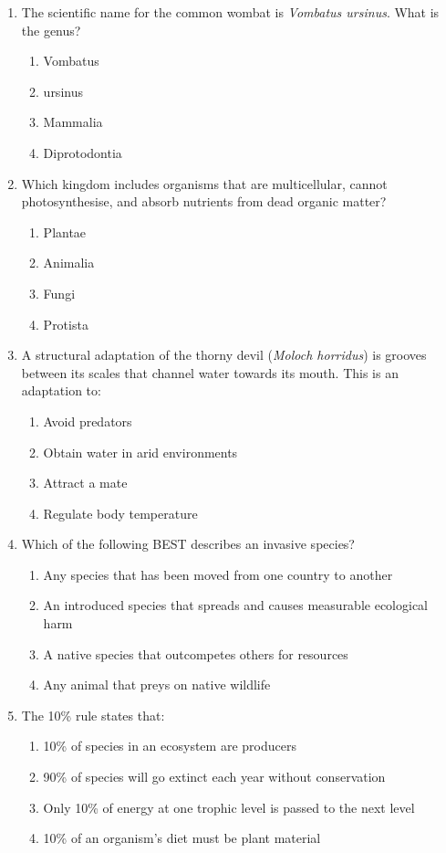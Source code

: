 \documentclass[11pt,a4paper]{article}
\begin{document}
\begin{enumerate}[label=\textbf{\arabic*.}, itemsep=10pt]
\item The scientific name for the common wombat is \textit{Vombatus ursinus}. What is the genus?
\begin{enumerate}[label=\Alph*., itemsep=2pt]
  \item Vombatus    \item ursinus    \item Mammalia    \item Diprotodontia
\end{enumerate}

\item Which kingdom includes organisms that are multicellular, cannot photosynthesise, and absorb nutrients from dead organic matter?
\begin{enumerate}[label=\Alph*., itemsep=2pt]
  \item Plantae    \item Animalia    \item Fungi    \item Protista
\end{enumerate}

\item A structural adaptation of the thorny devil (\textit{Moloch horridus}) is grooves between its scales that channel water towards its mouth. This is an adaptation to:
\begin{enumerate}[label=\Alph*., itemsep=2pt]
  \item Avoid predators    \item Obtain water in arid environments
  \item Attract a mate     \item Regulate body temperature
\end{enumerate}

\item Which of the following BEST describes an invasive species?
\begin{enumerate}[label=\Alph*., itemsep=2pt]
  \item Any species that has been moved from one country to another
  \item An introduced species that spreads and causes measurable ecological harm
  \item A native species that outcompetes others for resources
  \item Any animal that preys on native wildlife
\end{enumerate}

\item The 10\% rule states that:
\begin{enumerate}[label=\Alph*., itemsep=2pt]
  \item 10\% of species in an ecosystem are producers
  \item 90\% of species will go extinct each year without conservation
  \item Only 10\% of energy at one trophic level is passed to the next level
  \item 10\% of an organism's diet must be plant material
\end{enumerate}


\end{enumerate}
\end{document}
